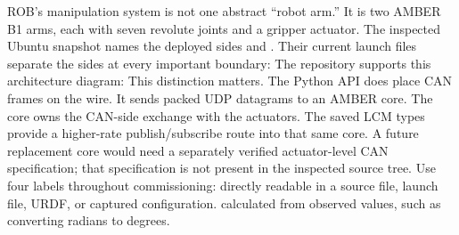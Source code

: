 \markdownRendererDocumentBegin
\markdownRendererSectionBegin
{}\markdownRendererInterblockSeparator
{}ROB's manipulation system is not one abstract “robot arm.” It is two AMBER B1 arms, each with seven revolute joints and a gripper actuator. The inspected Ubuntu snapshot names the deployed sides  and . Their current launch files separate the sides at every important boundary:\markdownRendererInterblockSeparator
{}\markdownRendererInterblockSeparator
{}The repository supports this architecture diagram:\markdownRendererInterblockSeparator
{}\markdownRendererInterblockSeparator
{}This distinction matters. The Python API does  place CAN frames on the wire. It sends packed UDP datagrams to an AMBER core. The core owns the CAN-side exchange with the actuators. The saved LCM types provide a higher-rate publish/subscribe route into that same core. A future replacement core would need a separately verified actuator-level CAN specification; that specification is not present in the inspected source tree.\markdownRendererInterblockSeparator
{}\markdownRendererSectionBegin
{}\markdownRendererInterblockSeparator
{}Use four labels throughout commissioning:\markdownRendererInterblockSeparator
{}\markdownRendererUlBegin
\markdownRendererUlItem {} directly readable in a source file, launch file, URDF, or captured configuration.\markdownRendererUlItemEnd 
\markdownRendererUlItem {} calculated from observed values, such as converting radians to degrees.\markdownRendererUlItemEnd 

